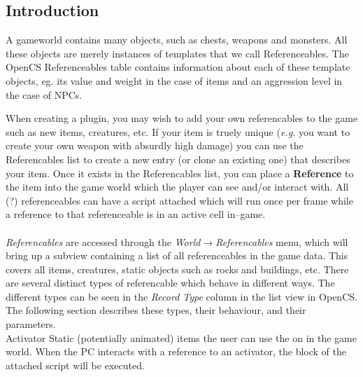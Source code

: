 \subsection{Introduction}
A gameworld contains many objects, such as chests, weapons and monsters. All these objects are merely instances of templates that we call Referenceables. The OpenCS Referenceables table contains information about each of these template objects, eg. its value and weight in the case of items and an aggression level in the case of NPCs.

\noindent
When creating a plugin, you may wish to add your own referencables to the game such as new items, creatures, etc. If your item is truely unique (\emph{e.g.} you want to create your own weapon with absurdly high damage) you can use the Referencables list to create a new entry (or clone an existing one) that describes your item. Once it exists in the Referencables list, you can place a \textbf{Reference} to the item into the game world which the player can see and/or interact with. All (?) referenceables can have a script attached which will run once per frame while a reference to that referenceable is in an active cell in--game.\\
\\
\noindent
\emph{Referencables} are accessed through the \emph{World$\rightarrow$Referencables} menu, which will bring up a subview containing a list of all referenceables in the game data. This covers all items, creatures, static objects such as rocks and buildings, etc. There are several distinct types of referencable which behave in different ways. The different types can be seen in the \emph{Record Type} column in the list view in OpenCS. The following section describes these types, their behaviour, and their parameters.\\

\ReferenceableSpec
{Activator}
{Static (potentially animated) items the user can use the \interactbutton{} on in the game world.}
{When the PC interacts with a reference to an activator, the \OnActivate{} block of the attached script will be executed.}
{


}

